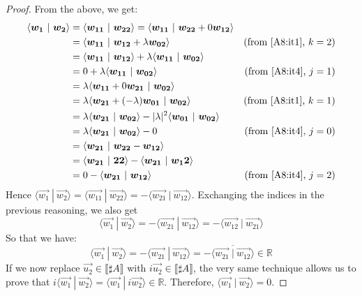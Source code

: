 \documentclass[runningheads,orivec]{llncs}
\def\R{\mathbb{R}}            %
\def\scal#1#2{\langle{#1}~|~{#2}\rangle}
\def\sem#1{\llbracket#1\rrbracket}
\begin{document}
\begin{proof}
    From the above, we get:
    \begin{align*}
        \scal{\vec{w_1}}{\vec{w_2}} &= \scal{\vec{w_{11}}}{\vec{w_{22}}} = \scal{\vec{w_{11}}}{\vec{w_{22}}+0\vec{w_{12}}} & \\
        &=\scal{\vec{w_{11}}}{\vec{w_{12}}+ \lambda\vec{w_{02}}} & (\text{from \Cref{A8:it1}, } k=2)\\
        &=\scal{\vec{w_{11}}}{\vec{w_{12}}} + \lambda \scal{\vec{w_{11}}}{\vec{w_{02}}} &\\
        &= 0 + \lambda \scal{\vec{w_{11}}}{\vec{w_{02}}} & (\text{from \Cref{A8:it4}, } j=1)\\
        &= \lambda \scal{\vec{w_{11}} + 0\vec{w_{21}}}{\vec{w_{02}}} & \\
        &= \lambda \scal{\vec{w_{21}} + (-\lambda)\vec{w_{01}}}{\vec{w_{02}}} & (\text{from \Cref{A8:it1}, } k=1)\\
        &= \lambda \scal{\vec{w_{21}}}{\vec{w_{02}}} - |\lambda|^2 \scal{\vec{w_{01}}}{\vec{w_{02}}} & \\
        &= \lambda \scal{\vec{w_{21}}}{\vec{w_{02}}} - 0 & (\text{from \Cref{A8:it4}, } j=0)\\
        &=\scal{\vec{w_{21}}}{\vec{w_{22}}- \vec{w_{12}}} & \\
        &=\scal{\vec{w_{21}}}{\vec{22}} - \scal{\vec{w_{21}}}{\vec{w_12}} & \\
        &= 0 - \scal{\vec{w_{21}}}{\vec{w_{12}}} & (\text{from \Cref{A8:it4}, } j=2)\\
    \end{align*}
    Hence $\scal{\vec{w_1}}{\vec{w_2}} = \scal{\vec{w_{11}}}{\vec{w_{22}}} = - \scal{\vec{w_{21}}}{\vec{w_{12}}}$. Exchanging the indices in the previous reasoning, we also get 
    \[
    \scal{\vec{w_1}}{\vec{w_2}}=-\scal{\vec{w_{21}}}{\vec{w_{12}}}=-\scal{\vec{w_{12}}}{\vec{w_{21}}}
    \]
    So that we have:
    \[
        \scal{\vec{w_1}}{\vec{w_2}}=-\scal{\vec{w_{21}}}{\vec{w_{12}}}=-\overline{\scal{\vec{w_{21}}}{\vec{w_{12}}}}\in\R
    \]
    If we now replace $\vec{u_2}\in\sem{\sharp A}$ with $i\vec{u_2}\in\sem{\sharp A}$, the very same technique allows us to prove that $i\scal{\vec{w_1}}{\vec{w_2}}=\scal{\vec{w_1}}{i \vec{w_2}}\in\R$. Therefore, $\scal{\vec{w_1}}{\vec{w_2}}=0$.
\end{proof}
\end{document}
